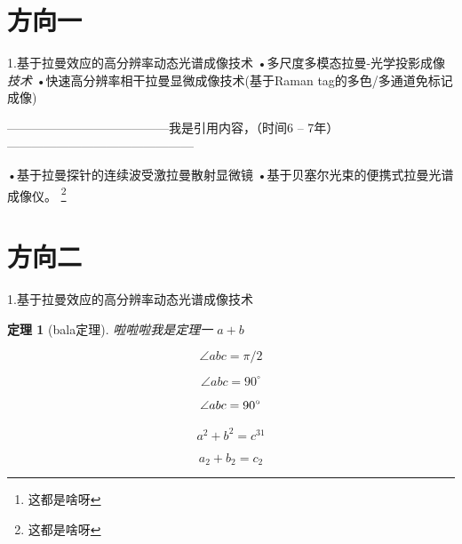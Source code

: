 \begin{abstract}
	围绕国家和陕西省在医药卫生健康领域重大战略需求，以服务国家战略为使命、以解决临床需求为初心、以影像技术发展为指引、以国家重大项目为依托，针对重大疾病早期精准诊疗前沿科学问题，围绕早期病变的精确有效定量，立足信息技术手段，从微观-宏观两个尺度、细胞-动物-人体三个层面研究多尺度定量光学分子成像技术，内容涵盖成像系统、成像理论、定量方法、图像分析、分子探针以及生物基础与转化医学应用。
	\footnote{这都是啥呀}	%
\end{abstract}

\tableofcontents	%

\section{方向一}	%
1.基于拉曼效应的高分辨率动态光谱成像技术
•多尺度多模态拉曼-光学投影成像\emph{技术}	%
•快速高分辨率相干拉曼显微成像技术(基于Raman tag的多色/多通道免标记成像)
\begin{myquote}
\centering	%
 \kaishu	%
—————————————我是引用内容，（时间6 -- 7年）———————————————
\end{myquote}
•基于拉曼探针的连续波受激拉曼散射显微镜
•基于贝塞尔光束的便携式拉曼光谱成像仪。
\footnote{这都是啥呀}	%

\section{方向二}	%
1.基于拉曼效应的高分辨率动态光谱成像技术

\newtheorem{thm1}{定理}	%
\begin{thm1}[bala定理]\label{eq:lalala}
	啦啦啦我是定理一 $a + b$	%
	
	\begin{equation}	%
		\angle abc = \pi / 2	%
	\end{equation}
	
	\begin{equation}	%
	\angle abc = 90^\circ	%
	\end{equation}
	
	\begin{equation}	%
	\angle abc = 90\degree	%
	\end{equation}
	
	\begin{equation}	%
	a^2 + b^2 = c^{31}		%
	\end{equation}
	
	\begin{equation}	%
	a_2 + b_2 = c_2		%
	\end{equation}
	
\end{thm1}

